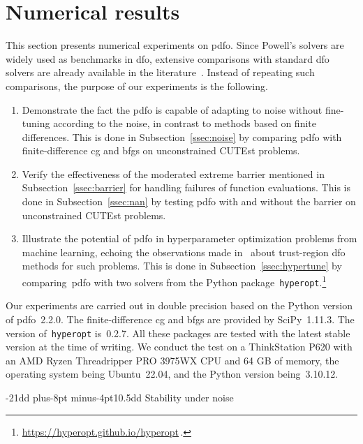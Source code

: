 \documentclass[smallextended]{svjour3}
\makeatletter
\def\subsection{\@startsection{subsection}{2}{\z@}%
    {-21dd plus-8pt minus-4pt}{10.5dd}
    {\normalsize\bfseries}}
\newcommand{\modified}[1]{#1}
\makeatother
\begin{document}
\section{Numerical results}
\label{sec:numerical}

This section presents numerical experiments on \gls{pdfo}.
Since Powell's solvers are widely used as benchmarks in \gls{dfo}, extensive comparisons with standard \gls{dfo} solvers are already available in the literature~\cite{More_Wild_2009,Rios_Sahinidis_2013}.
Instead of repeating such comparisons, the purpose of our experiments is the following.
\begin{enumerate}
    \item Demonstrate the fact the \gls{pdfo} is capable of adapting to noise without fine-tuning according to the noise, in contrast to methods based on finite differences.
        This is done in Subsection~\ref{ssec:noise} by comparing \gls{pdfo} with finite-difference \gls{cg} and \gls{bfgs} on unconstrained CUTEst problems.
    \item Verify the effectiveness of the moderated extreme barrier mentioned in Subsection~\ref{ssec:barrier} for handling failures of function evaluations.
        This is done in Subsection~\ref{ssec:nan} by testing \gls{pdfo} with and without the barrier on unconstrained CUTEst problems.
    \item Illustrate the potential of \gls{pdfo} in hyperparameter optimization problems from machine learning, echoing the observations made in~\cite{Ghanbari_Scheinberg_2017} about trust-region \gls{dfo} methods for such problems.
        This is done in Subsection~\ref{ssec:hypertune} by comparing~\gls{pdfo} with two solvers from the Python package~\texttt{hyperopt}.\footnote{\url{https://hyperopt.github.io/hyperopt}\,.}
\end{enumerate}

Our experiments are carried out in double precision based on the Python version of \gls{pdfo}~\modified{2.2.0}.
The finite-difference \gls{cg} and \gls{bfgs} are provided by SciPy~\modified{1.11.3}.
The version of~\texttt{hyperopt} is~0.2.7.
All these packages are tested with the latest stable version at the time of writing.
We conduct the test on a ThinkStation P620 with an AMD Ryzen Threadripper PRO 3975WX CPU and 64 GB of memory, the operating system being Ubuntu~22.04, and the Python version being~\modified{3.10.12}.

\subsection{Stability under noise}
\label{ssec:noise}
\end{document}
